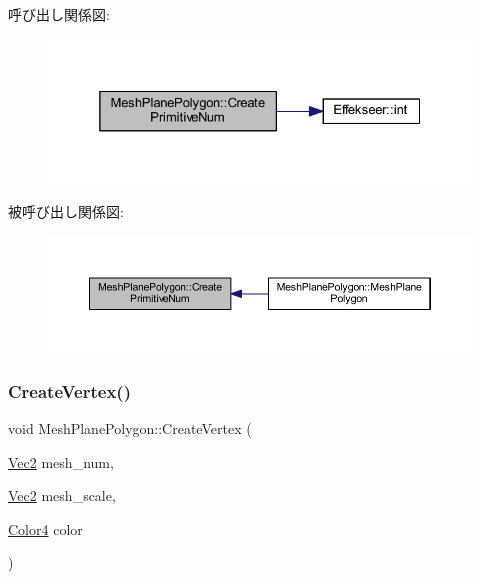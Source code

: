 呼び出し関係図\+:\nopagebreak
\begin{figure}[H]
\begin{center}
\leavevmode
\includegraphics[width=325pt]{class_mesh_plane_polygon_a0228c78794fe950ccb69b3a77a0239b8_cgraph}
\end{center}
\end{figure}
被呼び出し関係図\+:\nopagebreak
\begin{figure}[H]
\begin{center}
\leavevmode
\includegraphics[width=350pt]{class_mesh_plane_polygon_a0228c78794fe950ccb69b3a77a0239b8_icgraph}
\end{center}
\end{figure}
\mbox{\label{class_mesh_plane_polygon_a50cdb56a3faa5d0bbb8ff75c3dcc2830}} 
\subsubsection{\texorpdfstring{Create\+Vertex()}{CreateVertex()}}
{\footnotesize\ttfamily void Mesh\+Plane\+Polygon\+::\+Create\+Vertex (\begin{DoxyParamCaption}\item[{\mbox{\hyperlink{_vector3_d_8h_a5ef6e95dfc5f9d3820b71772d99bbc25}{Vec2}}}]{mesh\+\_\+num,  }\item[{\mbox{\hyperlink{_vector3_d_8h_a5ef6e95dfc5f9d3820b71772d99bbc25}{Vec2}}}]{mesh\+\_\+scale,  }\item[{\mbox{\hyperlink{_vector3_d_8h_a9c2339f516cf07ce4753b8a99fab3791}{Color4}}}]{color }\end{DoxyParamCaption})\hspace{0.3cm}{\ttfamily [private]}}



